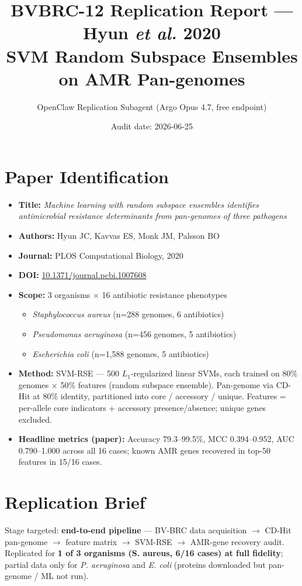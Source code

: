 \documentclass[11pt]{article}
\title{BVBRC-12 Replication Report --- Hyun \emph{et al.} 2020\\
\large SVM Random Subspace Ensembles on AMR Pan-genomes}
\author{OpenClaw Replication Subagent (Argo Opus 4.7, free endpoint)}
\date{Audit date: 2026-06-25}
\begin{document}
\maketitle

\section{Paper Identification}
\begin{itemize}
  \item \textbf{Title:} \emph{Machine learning with random subspace ensembles identifies antimicrobial resistance determinants from pan-genomes of three pathogens}
  \item \textbf{Authors:} Hyun JC, Kavvas ES, Monk JM, Palsson BO
  \item \textbf{Journal:} PLOS Computational Biology, 2020
  \item \textbf{DOI:} \href{https://doi.org/10.1371/journal.pcbi.1007608}{10.1371/journal.pcbi.1007608}
  \item \textbf{Scope:} 3 organisms $\times$ 16 antibiotic resistance phenotypes
    \begin{itemize}
      \item \emph{Staphylococcus aureus} (n=288 genomes, 6 antibiotics)
      \item \emph{Pseudomonas aeruginosa} (n=456 genomes, 5 antibiotics)
      \item \emph{Escherichia coli} (n=1{,}588 genomes, 5 antibiotics)
    \end{itemize}
  \item \textbf{Method:} SVM-RSE --- 500 $L_1$-regularized linear SVMs, each trained on 80\% genomes $\times$ 50\% features (random subspace ensemble). Pan-genome via CD-Hit at 80\% identity, partitioned into core / accessory / unique. Features = per-allele core indicators + accessory presence/absence; unique genes excluded.
  \item \textbf{Headline metrics (paper):} Accuracy 79.3--99.5\%, MCC 0.394--0.952, AUC 0.790--1.000 across all 16 cases; known AMR genes recovered in top-50 features in 15/16 cases.
\end{itemize}

\section{Replication Brief}
Stage targeted: \textbf{end-to-end pipeline} --- BV-BRC data acquisition $\to$ CD-Hit pan-genome $\to$ feature matrix $\to$ SVM-RSE $\to$ AMR-gene recovery audit. Replicated for \textbf{1 of 3 organisms (S. aureus, 6/16 cases) at full fidelity}; partial data only for \emph{P. aeruginosa} and \emph{E. coli} (proteins downloaded but pan-genome / ML not run).
\end{document}
